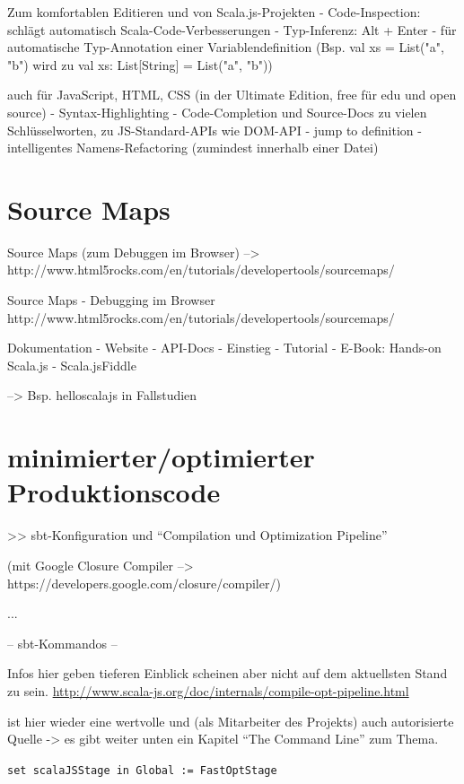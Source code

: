 \documentclass[a4paper, 12pt, hidelinks, listof=totoc, listoftables=totoc, bibliography=totoc]{scrreprt}
\begin{document}
    Zum komfortablen Editieren und von Scala.js-Projekten
    - Code-Inspection: schlägt automatisch Scala-Code-Verbesserungen
    - Typ-Inferenz: Alt + Enter - für automatische Typ-Annotation einer Variablendefinition (Bsp. val xs = List("a", "b") wird zu val xs: List[String] = List("a", "b"))

    auch für JavaScript, HTML, CSS (in der Ultimate Edition, free für edu und open source)
      - Syntax-Highlighting
      - Code-Completion und Source-Docs zu vielen Schlüsselworten, zu JS-Standard-APIs wie DOM-API
      - jump to definition
      - intelligentes Namens-Refactoring (zumindest innerhalb einer Datei)


\section{Source Maps}

Source Maps (zum Debuggen im Browser)  -->  http://www.html5rocks.com/en/tutorials/developertools/sourcemaps/

Source Maps
  - Debugging im Browser
  http://www.html5rocks.com/en/tutorials/developertools/sourcemaps/

Dokumentation
  - Website
  - API-Docs
  - Einstieg
    - Tutorial
    - E-Book: Hands-on Scala.js
    - Scala.jsFiddle

--> Bsp. helloscalajs in Fallstudien


\section{minimierter/optimierter Produktionscode}
\label{sec:compiler}

>> sbt-Konfiguration und "`Compilation und Optimization Pipeline"'

(mit Google Closure Compiler  -->  https://developers.google.com/closure/compiler/)

...


-- sbt-Kommandos --

Infos hier geben tieferen Einblick scheinen aber nicht auf dem aktuellsten Stand zu sein.
\url{http://www.scala-js.org/doc/internals/compile-opt-pipeline.html}

\cite[\#TheCommandLine]{haoyi.HOS} ist hier wieder eine wertvolle und (als Mitarbeiter des Projekts) auch autorisierte Quelle -> es gibt weiter unten ein Kapitel "`The Command Line"' zum Thema.

\texttt{set scalaJSStage in Global := FastOptStage}
\end{document}
